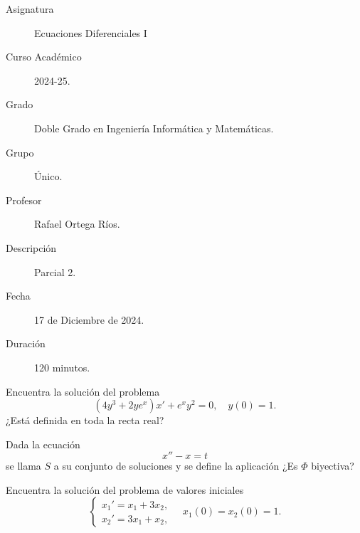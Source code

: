 \documentclass[12pt]{article}
\begin{document}

    
    

    \begin{description}
        \item[Asignatura] Ecuaciones Diferenciales I
        \item[Curso Académico] 2024-25.
        \item[Grado] Doble Grado en Ingeniería Informática y Matemáticas.
        \item[Grupo] Único.
        \item[Profesor] Rafael Ortega Ríos.
        \item[Descripción] Parcial 2.
        \item[Fecha] 17 de Diciembre de 2024.
        \item[Duración] 120 minutos.    
    \end{description}
    \newpage

    \begin{ejercicio}
        Encuentra la solución del problema
        \begin{equation*}
            (4y^3+2ye^x)x'+e^xy^2=0,\quad y(0)=1.
        \end{equation*}
        ¿Está definida en toda la recta real?
    \end{ejercicio}

    \begin{ejercicio}
        Dada la ecuación
        \begin{equation*}
            x''-x=t
        \end{equation*}
        se llama $S$ a su conjunto de soluciones y se define la aplicación
        ¿Es $\Phi$ biyectiva?
    \end{ejercicio}

    \begin{ejercicio}
        Encuentra la solución del problema de valores iniciales
        \begin{equation*}
            \begin{cases}
                x_1'=x_1+3x_2,\\
                x_2'=3x_1+x_2,
            \end{cases}
            \quad x_1(0)=x_2(0)=1.
        \end{equation*}
    \end{ejercicio}
\end{document}
